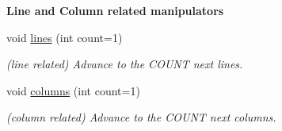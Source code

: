 \begin{Indent}{\bf Line and Column related manipulators}\par
\begin{DoxyCompactItemize}
\item 
void \hyperlink{classEzAquarii_1_1position_aa349bbed29ca6ceea84e9ae087c92e6d}{lines} (int count=1)\hypertarget{classEzAquarii_1_1position_aa349bbed29ca6ceea84e9ae087c92e6d}{}\label{classEzAquarii_1_1position_aa349bbed29ca6ceea84e9ae087c92e6d}

\begin{DoxyCompactList}\small\item\em (line related) Advance to the C\+O\+U\+NT next lines. \end{DoxyCompactList}\item 
void \hyperlink{classEzAquarii_1_1position_a58b9d9cc85f88ba0444f8754a3150cf6}{columns} (int count=1)\hypertarget{classEzAquarii_1_1position_a58b9d9cc85f88ba0444f8754a3150cf6}{}\label{classEzAquarii_1_1position_a58b9d9cc85f88ba0444f8754a3150cf6}

\begin{DoxyCompactList}\small\item\em (column related) Advance to the C\+O\+U\+NT next columns. \end{DoxyCompactList}\end{DoxyCompactItemize}
\end{Indent}
